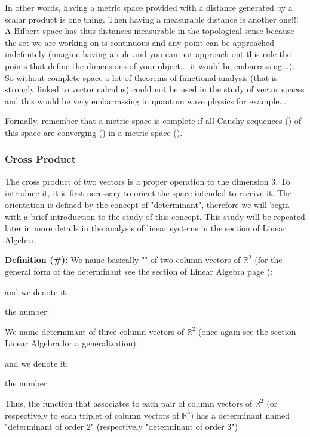 	In other words, having a metric space provided with a distance generated by a scalar product is one thing. Then having a measurable distance is another one!!! A Hilbert space has thus distances measurable in the topological sense because the set we are working on is continuous and any point can be approached indefinitely (imagine having a rule and you can not approach ont this rule the points that define the dimensions of your object... it would be embarrassing...). So without complete space a lot of theorems of functional analysis (that is strongly linked to vector calculus) could not be used in the study of vector spaces and this would be very embarrassing in quantum wave physics for example...
	
	Formally, remember that a metric space is complete if all Cauchy sequences () of this space are converging () in a metric space ().
	
	\subsubsection{Cross Product}
	The cross product of two vectors is a proper operation to the dimension $3$. To introduce it, it is first necessary to orient the space intended to receive it. The orientation is defined by the concept of "determinant", therefore we will begin with a brief introduction to the study of this concept. This study will be repeated later in more details in the analysis of linear systems in the section of Linear Algebra.
	
	\textbf{Definition (\#\mydef):} We name basically "" of two column vectors of $\mathbb{R}^2$ (for the general form of the determinant see the section of Linear Algebra page \pageref{determinant}):
	
	and we denote it:
	
	the number:
	
	We name determinant of three column vectors of $\mathbb{R}^2$ (once again see the section Linear Algebra for a generalization):
	
	and we denote it:
	
	the number:
	
	Thus, the function that associates to each pair of column vectors of $\mathbb{R}^2$ (or respectively to each triplet of column vectors of $\mathbb{R}^3$) has a determinant named "determinant of order $2$" (respectively "determinant of order $3$")
	
